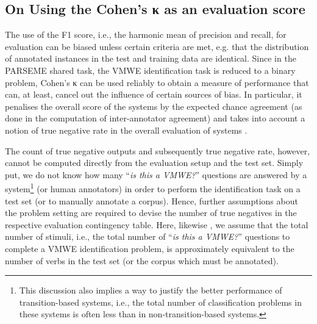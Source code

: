 \documentclass[output=paper,modfonts,nonflat,draftmode]{langsci/langscibook}
\begin{document}
\subsection{On Using the Cohen's κ as an evaluation score}

The use of the F1 score, i.e., the harmonic mean of precision and recall, for evaluation can be biased unless certain criteria are met, e.g. that the distribution of annotated instances in the test and training data are identical. Since in the PARSEME shared task, the VMWE identification task is reduced to a binary  problem, Cohen's κ can be used reliably to obtain a measure of performance that can, at least, cancel out the influence of certain sources of bias. In particular, it penalises the overall score of the systems by the expected chance agreement (as done in the computation of inter-annotator agreement) and takes into account a notion of true negative rate in the overall evaluation of systems \citep{Powers2012,Powers15}. 

The count of true negative outputs and subsequently true negative rate, however, cannot be computed directly from the evaluation setup and the test set. Simply put, we do not know how many ``\emph{is this a VMWE?}'' questions are answered by a system\footnote{This discussion also implies a way to justify the better performance of transition-based systems, i.e., the total number of classification problems in these systems is often less than in non-transition-based systems.} (or human annotators) in order to perform the identification task on a test set (or to manually annotate a corpus). Hence, further assumptions about the problem setting are required to devise the number of true negatives in the respective evaluation contingency table. Here, likewise \citep{MWEWorkshop}, we assume that the total number of stimuli, i.e., the total number of ``\emph{is this a VMWE?}'' questions to complete a VMWE identification problem, is approximately equivalent to the number of verbs in the test set (or the corpus which must be annotated).
\end{document}
